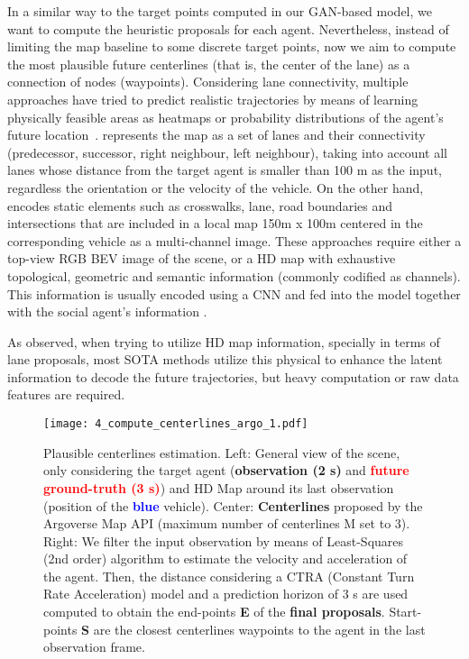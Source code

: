 In a similar way to the target points computed in our \ac{GAN}-based model, we want to compute the heuristic proposals for each agent. Nevertheless, instead of limiting the map baseline to some discrete target points, now we aim to compute the most plausible future centerlines (that is, the center of the lane) as a connection of nodes (waypoints). Considering lane connectivity, multiple approaches have tried to predict realistic trajectories by means of learning physically feasible areas as heatmaps or probability distributions of the agent’s future location~\cite{dendorfer2020goal, sadeghian2019sophie, gilles2021home}. \cite{liang2020learning} represents the map as a set of lanes and their connectivity (predecessor, successor, right neighbour, left neighbour), taking into account all lanes whose distance from the target agent is smaller than 100 m as the input, regardless the orientation or the velocity of the vehicle. On the other hand, \cite{djuric2021multixnet} encodes static elements such as crosswalks, lane, road boundaries and intersections that are included in a local map 150m x 100m centered in the corresponding vehicle  as a multi-channel image.  These approaches require either a top-view RGB \ac{BEV} image of the scene, or a HD map with exhaustive topological, geometric and semantic information (commonly codified as channels). This information is usually encoded using a \ac{CNN} and fed into the model together with the social agent's information \cite{dendorfer2020goal, sadeghian2019sophie, gao2020vectornet}. 

As observed, when trying to utilize HD map information, specially in terms of lane proposals, most SOTA methods utilize this physical to enhance the latent information to decode the future trajectories, but heavy computation or raw data features are required. 

\begin{figure*}[]
	\centering
	\texttt{[image: 4\_compute\_centerlines\_argo\_1.pdf]}
	
	\caption{Plausible centerlines estimation. Left: General view of the scene, only considering the target agent (\textbf{\textcolor{YellowOrange}{observation (2 s)}} and \textbf{\textcolor{red}{future ground-truth (3 s)}}) and HD Map around its last observation (position of the \textbf{\textcolor{blue}{blue}} vehicle). Center: \textbf{Centerlines} proposed by the Argoverse Map API (maximum number of centerlines M set to 3). Right: We filter the input observation by means of Least-Squares (2nd order) algorithm to estimate the velocity and acceleration of the agent. Then, the distance considering a CTRA (Constant Turn Rate Acceleration) model and a prediction horizon of 3 s are used computed to obtain the end-points \textbf{E} of the \textbf{final proposals}. Start-points \textbf{S} are the closest centerlines waypoints to the agent in the last observation frame.}
	\label{fig:4_efficient_baselines_hdmap_filtering}
\end{figure*}

